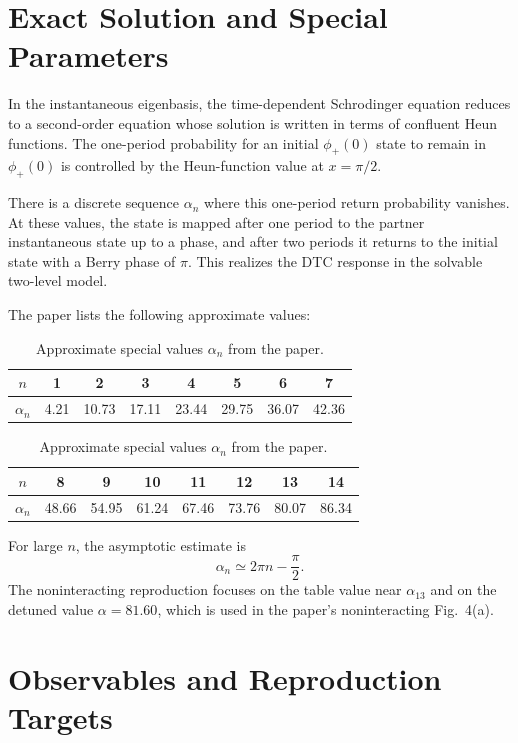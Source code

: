 \documentclass[11pt,a4paper]{article}
\begin{document}
\section{Exact Solution and Special Parameters}

In the instantaneous eigenbasis, the time-dependent Schrodinger equation reduces to a second-order equation whose solution is written in terms of confluent Heun functions. The one-period probability for an initial \(\phi_+(0)\) state to remain in \(\phi_+(0)\) is controlled by the Heun-function value at \(x=\pi/2\).

There is a discrete sequence \(\alpha_n\) where this one-period return probability vanishes. At these values, the state is mapped after one period to the partner instantaneous state up to a phase, and after two periods it returns to the initial state with a Berry phase of \(\pi\). This realizes the DTC response in the solvable two-level model.

The paper lists the following approximate values:
\begin{table}[h]
\centering
\caption{Approximate special values \(\alpha_n\) from the paper.}
\begin{tabular}{cccccccc}
\toprule
\(n\) & 1 & 2 & 3 & 4 & 5 & 6 & 7 \\
\midrule
\(\alpha_n\) & 4.21 & 10.73 & 17.11 & 23.44 & 29.75 & 36.07 & 42.36 \\
\bottomrule
\end{tabular}

\vspace{0.6em}
\begin{tabular}{cccccccc}
\toprule
\(n\) & 8 & 9 & 10 & 11 & 12 & 13 & 14 \\
\midrule
\(\alpha_n\) & 48.66 & 54.95 & 61.24 & 67.46 & 73.76 & 80.07 & 86.34 \\
\bottomrule
\end{tabular}
\end{table}

For large \(n\), the asymptotic estimate is
\begin{equation}
\alpha_n \simeq 2\pi n - \frac{\pi}{2}.
\end{equation}
The noninteracting reproduction focuses on the table value near \(\alpha_{13}\) and on the detuned value \(\alpha=81.60\), which is used in the paper's noninteracting Fig.~4(a).

\section{Observables and Reproduction Targets}
\end{document}

